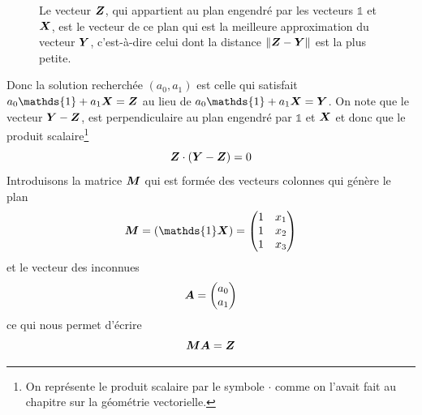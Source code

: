 \begin{figure}[h]
\caption{\label{fig:oui-plan}
Le vecteur  $\boldsymbol{Z}$, qui appartient au plan engendré par les vecteurs 
$\mathds{1}$ et $\boldsymbol{X}$, est le vecteur de ce plan qui est la meilleure
approximation du vecteur
$\boldsymbol{Y}$, c'est-à-dire celui dont la distance $\lVert\boldsymbol{Z} - \boldsymbol{Y}\rVert$
est la plus petite.
}
\end{figure}
Donc la solution recherchée $(a_0, a_1)$ est celle qui satisfait
$a_0 \mathds{1} + a_1\matX = \matZ$ au lieu de $a_0 \mathds{1} + a_1\matX = \matY$.
On note que le vecteur $\boldsymbol{Y} - \boldsymbol{Z}$, est perpendiculaire au plan engendré par
$\mathds{1}$ et $\boldsymbol{X}$ et donc que le produit scalaire\footnote{On représente le
produit scalaire par le symbole $\cdot$ comme on l'avait fait au chapitre
sur la géométrie vectorielle.} 
\[
\boldsymbol{Z} \cdot (\boldsymbol{Y} -\boldsymbol{Z}) = 0
\]
Introduisons la matrice $\boldsymbol{M}$ qui est formée des vecteurs colonnes qui génère le plan
\[
\matM = (\mathds{1} \matX) = \begin{pmatrix}
1 & x_1 \\
1 & x_2 \\
1 & x_3
\end{pmatrix}
\]
et le vecteur des inconnues
\[
\boldsymbol{A} = \begin{pmatrix}
a_0 \\ a_1
\end{pmatrix}
\]
ce qui nous permet d'écrire
\begin{equation}
\boldsymbol{M}\boldsymbol{A} = \boldsymbol{Z} \label{eq:Z}
\end{equation}
